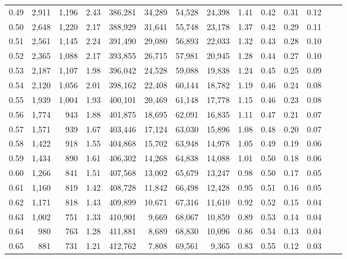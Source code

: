 \begin{tabular}{rrrrrrrrrrrrrr}
0.49 &   2,911 &  1,196 &    2.43 &  386,281 &   34,289 &  54,528 &  24,398 &  1.41 &  0.42 &  0.31 &      0.12 \\
0.50 &   2,648 &  1,220 &    2.17 &  388,929 &   31,641 &  55,748 &  23,178 &  1.37 &  0.42 &  0.29 &      0.11 \\
0.51 &   2,561 &  1,145 &    2.24 &  391,490 &   29,080 &  56,893 &  22,033 &  1.32 &  0.43 &  0.28 &      0.10 \\
0.52 &   2,365 &  1,088 &    2.17 &  393,855 &   26,715 &  57,981 &  20,945 &  1.28 &  0.44 &  0.27 &      0.10 \\
0.53 &   2,187 &  1,107 &    1.98 &  396,042 &   24,528 &  59,088 &  19,838 &  1.24 &  0.45 &  0.25 &      0.09 \\
0.54 &   2,120 &  1,056 &    2.01 &  398,162 &   22,408 &  60,144 &  18,782 &  1.19 &  0.46 &  0.24 &      0.08 \\
0.55 &   1,939 &  1,004 &    1.93 &  400,101 &   20,469 &  61,148 &  17,778 &  1.15 &  0.46 &  0.23 &      0.08 \\
0.56 &   1,774 &    943 &    1.88 &  401,875 &   18,695 &  62,091 &  16,835 &  1.11 &  0.47 &  0.21 &      0.07 \\
0.57 &   1,571 &    939 &    1.67 &  403,446 &   17,124 &  63,030 &  15,896 &  1.08 &  0.48 &  0.20 &      0.07 \\
0.58 &   1,422 &    918 &    1.55 &  404,868 &   15,702 &  63,948 &  14,978 &  1.05 &  0.49 &  0.19 &      0.06 \\
0.59 &   1,434 &    890 &    1.61 &  406,302 &   14,268 &  64,838 &  14,088 &  1.01 &  0.50 &  0.18 &      0.06 \\
0.60 &   1,266 &    841 &    1.51 &  407,568 &   13,002 &  65,679 &  13,247 &  0.98 &  0.50 &  0.17 &      0.05 \\
0.61 &   1,160 &    819 &    1.42 &  408,728 &   11,842 &  66,498 &  12,428 &  0.95 &  0.51 &  0.16 &      0.05 \\
0.62 &   1,171 &    818 &    1.43 &  409,899 &   10,671 &  67,316 &  11,610 &  0.92 &  0.52 &  0.15 &      0.04 \\
0.63 &   1,002 &    751 &    1.33 &  410,901 &    9,669 &  68,067 &  10,859 &  0.89 &  0.53 &  0.14 &      0.04 \\
0.64 &     980 &    763 &    1.28 &  411,881 &    8,689 &  68,830 &  10,096 &  0.86 &  0.54 &  0.13 &      0.04 \\
0.65 &     881 &    731 &    1.21 &  412,762 &    7,808 &  69,561 &   9,365 &  0.83 &  0.55 &  0.12 &      0.03 \\

\end{tabular}
